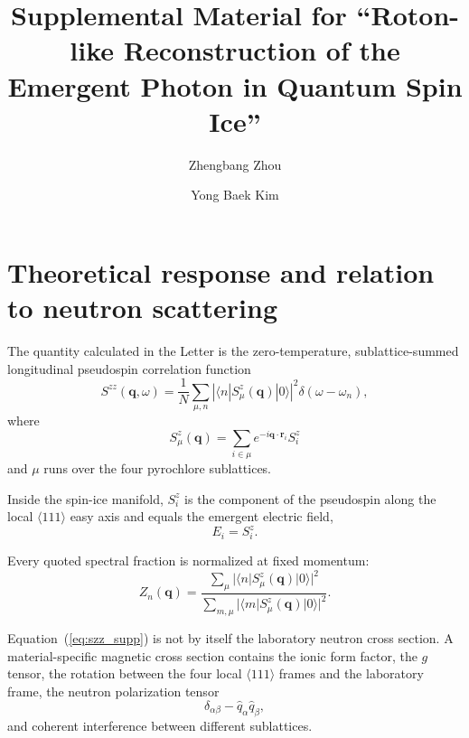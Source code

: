 \documentclass[
aps,
prl,
onecolumn,
amsmath,
amssymb,
superscriptaddress,
longbibliography
]{revtex4-2}
\newcommand{\bq}{\bm q}
\newcommand{\Szz}{S^{zz}}
\begin{document}
\title{
Supplemental Material for
``Roton-like Reconstruction of the Emergent Photon in Quantum Spin Ice''
}

\author{Zhengbang Zhou}

\author{Yong Baek Kim}

\maketitle

\section{Theoretical response and relation to neutron scattering}
\label{sec:observable}

The quantity calculated in the Letter is the zero-temperature,
sublattice-summed longitudinal pseudospin correlation function
\begin{equation}
\Szz(\bq,\omega)
=
\frac{1}{N}
\sum_{\mu,n}
\left|
\langle n|S_\mu^z(\bq)|0\rangle
\right|^2
\delta(\omega-\omega_n),
\label{eq:szz_supp}
\end{equation}
where
\begin{equation}
S_\mu^z(\bq)
=
\sum_{i\in\mu}
e^{-i\bq\cdot\bm r_i}S_i^z
\end{equation}
and $\mu$ runs over the four pyrochlore sublattices.

Inside the spin-ice manifold, $S_i^z$ is the component of the
pseudospin along the local $\langle111\rangle$ easy axis and equals
the emergent electric field,
\begin{equation}
E_i=S_i^z .
\end{equation}

Every quoted spectral fraction is normalized at fixed momentum:
\begin{equation}
Z_n(\bq)
=
\frac{
\sum_\mu
|\langle n|S_\mu^z(\bq)|0\rangle|^2
}{
\sum_{m,\mu}
|\langle m|S_\mu^z(\bq)|0\rangle|^2
}.
\end{equation}

Equation~(\ref{eq:szz_supp}) is not by itself the laboratory neutron
cross section.
A material-specific magnetic cross section contains the ionic form
factor, the $g$ tensor, the rotation between the four local
$\langle111\rangle$ frames and the laboratory frame, the neutron
polarization tensor
\begin{equation}
\delta_{\alpha\beta}
-
\hat q_\alpha\hat q_\beta,
\end{equation}
and coherent interference between different sublattices.
\end{document}
